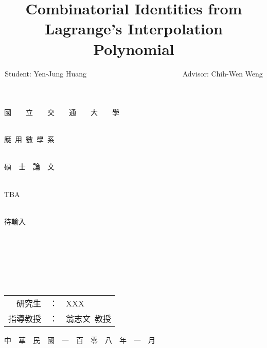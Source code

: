 \documentclass[12pt]{report}%
\title{Combinatorial Identities from Lagrange's Interpolation Polynomial}
\author{Student: Yen-Jung Huang  ~~~~~~~~~~~~~~~~~~~~~~~~~~Advisor: Chih-Wen Weng}
\date{} %
\theoremstyle{plain}
\theoremstyle{definition}
\begin{document}

\thispagestyle{empty}
\begin{center}
{ \Huge 國~~~~立~~~~交~~~~通~~~~大~~~~學}~\\~\\

\bigskip

{ \Huge 應~用~數~學~系}~\\~\\

\bigskip

{ \Huge 碩~~士~~論~~文}~\\~\\

\bigskip \bigskip\bigskip\bigskip\bigskip\bigskip

{ \Huge TBA}~\\~\\

\bigskip

{ \Huge 待輸入}~\\~\\
~\\~\\~\\~\\~\\
\bigskip \bigskip\bigskip\bigskip\bigskip\bigskip
\bigskip \bigskip\bigskip\bigskip\bigskip\bigskip
\bigskip\bigskip\bigskip

{ \Large
\begin{tabular}{rcl}
研究生&：&XXX\\
指導教授&：&翁志文~教授
\end{tabular} }

\bigskip\bigskip
{ \Large 中~~華~~民~~國~~一~~百~~零~~八~~年~~一~~月 }
\large
\end{center}
\pagebreak
\end{document}
